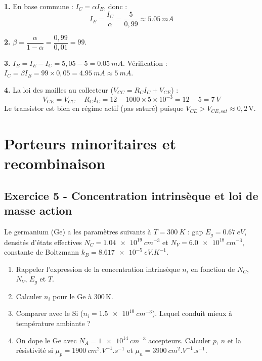 \documentclass[12pt,a4paper]{article}
\begin{document}
\begin{boitecorrige}
\textbf{1.} En base commune : $I_C = \alpha I_E$, donc :
\[
I_E = \frac{I_C}{\alpha} = \frac{5}{0{,}99} \approx \qty{5.05}{mA}
\]

\textbf{2.} $\beta = \dfrac{\alpha}{1-\alpha} = \dfrac{0{,}99}{0{,}01} = 99$.

\textbf{3.} $I_B = I_E - I_C = 5{,}05 - 5 = \qty{0.05}{mA}$. Vérification : $I_C = \beta I_B = 99\times0{,}05 = \qty{4.95}{mA} \approx \qty{5}{mA}$.

\textbf{4.} La loi des mailles au collecteur ($V_{CC} = R_C I_C + V_{CE}$) :
\[
V_{CE} = V_{CC} - R_C I_C = 12 - 1000\times5\times10^{-3} = 12 - 5 = \qty{7}{V}
\]
Le transistor est bien en régime actif (pas saturé) puisque $V_{CE}>V_{CE,sat}\approx0{,}2\,\text{V}$.
\end{boitecorrige}

\section{Porteurs minoritaires et recombinaison}

\subsection*{Exercice 5 - Concentration intrinsèque et loi de masse action \niveau{\moyen}}

\begin{boiteexercice}
Le germanium (Ge) a les paramètres suivants à $T = \qty{300}{K}$ : gap $E_g = \qty{0.67}{eV}$, densités d'états effectives $N_C = \qty{1.04e19}{cm^{-3}}$ et $N_V = \qty{6.0e18}{cm^{-3}}$, constante de Boltzmann $k_B = \qty{8.617e-5}{eV.K^{-1}}$.
\begin{enumerate}
  \item Rappeler l'expression de la concentration intrinsèque $n_i$ en fonction de $N_C$, $N_V$, $E_g$ et $T$.
  \item Calculer $n_i$ pour le Ge à 300\,K.
  \item Comparer avec le Si ($n_i = \qty{1.5e10}{cm^{-3}}$). Lequel conduit mieux à température ambiante ?
  \item On dope le Ge avec $N_A = \qty{1e14}{cm^{-3}}$ accepteurs. Calculer $p$, $n$ et la résistivité si $\mu_p = \qty{1900}{cm^2.V^{-1}.s^{-1}}$ et $\mu_n = \qty{3900}{cm^2.V^{-1}.s^{-1}}$.
\end{enumerate}
\end{boiteexercice}
\end{document}
